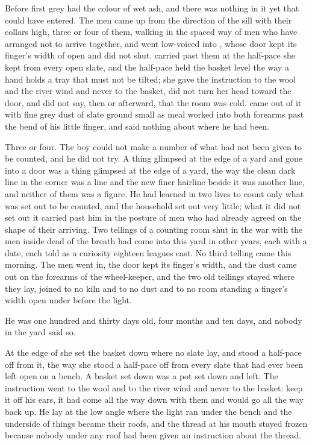
Before first grey  had the colour of wet ash, and there was nothing in it yet that  could have entered. The men came up from the direction of the sill with their collars high, three or four of them, walking in the spaced way of men who have arranged not to arrive together, and went low-voiced into , whose door kept its finger's width of open and did not shut.  carried  past them at the half-pace she kept from every open slate, and the half-pace held the basket level the way a hand holds a tray that must not be tilted; she gave the instruction to the wool and the river wind and never to the basket, did not turn her head toward the door, and did not say, then or afterward, that the room was cold.  came out of it with fine grey dust of slate ground small as meal worked into both forearms past the bend of his little finger, and said nothing about where he had been.

Three or four. The boy could not make a number of what had not been given to be counted, and he did not try. A thing glimpsed at the edge of a yard and gone into a door was a thing glimpsed at the edge of a yard, the way the clean dark line in the corner was a line and the new finer hairline beside it was another line, and neither of them was a figure. He had learned in two lives to count only what was set out to be counted, and the household set out very little; what it did not set out it carried past him in the posture of men who had already agreed on the shape of their arriving. Two tellings of a counting room shut in the war with the men inside dead of the breath had come into this yard in other years, each with a date, each told as a curiosity eighteen leagues east. No third telling came this morning. The men went in, the door kept its finger's width, and the dust came out on the forearms of the wheel-keeper, and the two old tellings stayed where they lay, joined to no kiln and to no dust and to no room standing a finger's width open under  before the light.

He was one hundred and thirty days old, four months and ten days, and nobody in the yard said so.

At the edge of  she set the basket down where no slate lay, and stood a half-pace off from it, the way she stood a half-pace off from every slate that had ever been left open on a bench. A basket set down was a pot set down and left. The instruction went to the wool and to the river wind and never to the basket: keep it off his ears, it had come all the way down with them and would go all the way back up. He lay at the low angle where the light ran under the bench and the underside of things became their roofs, and the thread at his mouth stayed frozen because nobody under any roof had been given an instruction about the thread.

